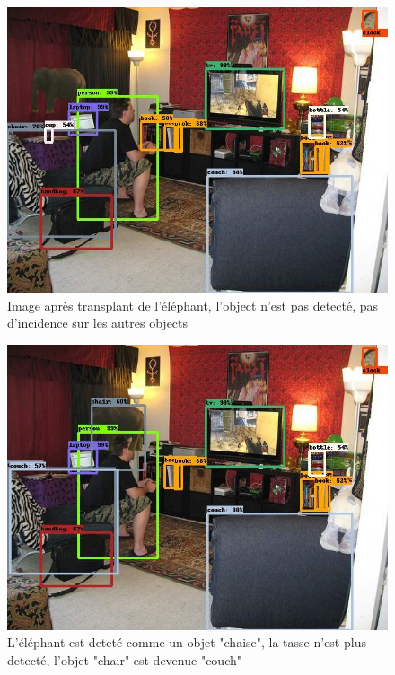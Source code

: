 \documentclass[12pt, letterpaper]{article}
\begin{document}
\begin{figure}[H]
    \includegraphics[width=\linewidth]{img/fig13.jpg}
    \caption{Image après transplant de l'éléphant, l'object n'est pas detecté, pas d'incidence sur les autres objects }
    \label{fig:L12}
\end{figure}

\begin{figure}[H]
    \includegraphics[width=\linewidth]{img/fig14.jpg}
    \caption{L'éléphant est deteté comme un objet "chaise", la tasse n'est plus detecté, l'objet "chair" est devenue "couch"}
    \label{fig:L13}
\end{figure}
\end{document}
